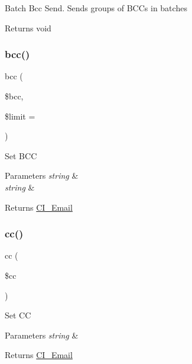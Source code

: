 Batch Bcc Send. Sends groups of B\+C\+Cs in batches

\begin{DoxyReturn}{Returns}
void 
\end{DoxyReturn}
\mbox{\label{class_c_i___email_ae7da2abc30865dd8ba3fcb3366889d7a}} 
\subsubsection{\texorpdfstring{bcc()}{bcc()}}
{\footnotesize\ttfamily bcc (\begin{DoxyParamCaption}\item[{}]{\$bcc,  }\item[{}]{\$limit = {\ttfamily \textquotesingle{}\textquotesingle{}} }\end{DoxyParamCaption})}

Set B\+CC


\begin{DoxyParams}{Parameters}
{\em string} & \\
\hline
{\em string} & \\
\hline
\end{DoxyParams}
\begin{DoxyReturn}{Returns}
\mbox{\hyperlink{class_c_i___email}{C\+I\+\_\+\+Email}} 
\end{DoxyReturn}
\mbox{\label{class_c_i___email_a785e883837f95eeffed21226563fc7e5}} 
\subsubsection{\texorpdfstring{cc()}{cc()}}
{\footnotesize\ttfamily cc (\begin{DoxyParamCaption}\item[{}]{\$cc }\end{DoxyParamCaption})}

Set CC


\begin{DoxyParams}{Parameters}
{\em string} & \\
\hline
\end{DoxyParams}
\begin{DoxyReturn}{Returns}
\mbox{\hyperlink{class_c_i___email}{C\+I\+\_\+\+Email}} 
\end{DoxyReturn}
\mbox{\label{class_c_i___email_ab8139994bc1b1bee3d2750b627cdd0c6}} 
